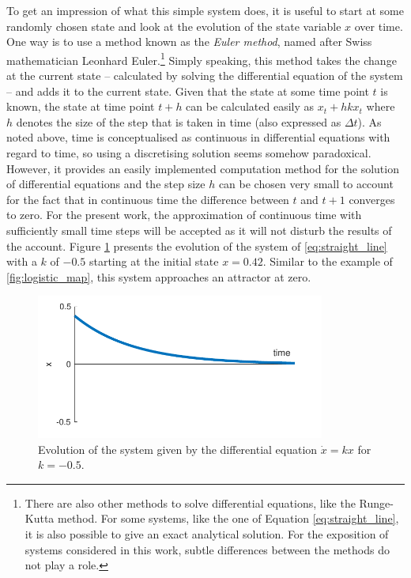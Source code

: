 To get an impression of what this simple system does, it is useful to start at some randomly chosen state and look at the evolution of the state variable $x$ over time. One way is to use a method known as the \emph{Euler method}, named after Swiss mathematician Leonhard Euler.\footnote{There are also other methods to solve differential equations, like the Runge-Kutta method. For some systems, like the one of Equation \ref{eq:straight_line}, it is also possible to give an exact analytical solution. For the exposition of systems considered in this work, subtle differences between the methods do not play a role.} Simply speaking, this method takes the change at the current state -- calculated by solving the differential equation of the system -- and adds it to the current state. Given that the state at some time point $t$ is known, the state at time point $t+h$ can be calculated easily as $x_t + hkx_t$ \citep{Fuchs2013} where $h$ denotes the size of the step that is taken in time (also expressed as $\Delta t$). As noted above, time is conceptualised as continuous in differential equations with regard to time, so using a discretising solution seems somehow paradoxical. However, it provides an easily implemented computation method for the solution of differential equations and the step size $h$ can be chosen very small to account for the fact that in continuous time the difference between $t$ and $t+1$ converges to zero. For the present work, the approximation of continuous time with sufficiently small time steps will be accepted as it will not disturb the results of the account. Figure \ref{fig:evolution_of_straight_line1} presents the evolution of the system of \ref{eq:straight_line} with a $k$ of $-0.5$ starting at the initial state $x = 0.42$. Similar to the example of \ref{fig:logistic_map}, this system approaches an attractor at zero.

\begin{figure}
\includegraphics[width=9.5cm]{figures/ch3/evolution_of_straight_line1.pdf}
\caption{Evolution of the system given by the differential equation $\dot{x} = kx$ for $k = -0.5$.}
\label{fig:evolution_of_straight_line1}
\end{figure}

